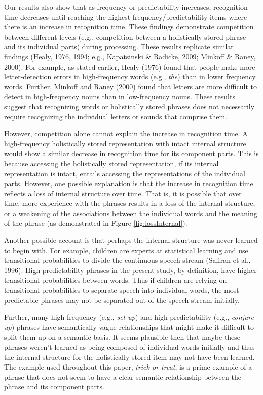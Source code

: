 \documentclass[
  man,floatsintext]{apa6}
\begin{document}
Our results also show that as frequency or predictability increases, recognition time decreases until reaching the highest frequency/predictability items where there is an increase in recognition time. These findings demonstrate competition between different levels (e.g., competition between a holistically stored phrase and its individual parts) during processing. These results replicate similar findings (Healy, 1976, 1994; e.g., Kapatsinski \& Radicke, 2009; Minkoff \& Raney, 2000). For example, as stated earlier, Healy (1976) found that people make more letter-detection errors in high-frequency words (e.g., \emph{the}) than in lower frequency words. Further, Minkoff and Raney (2000) found that letters are more difficult to detect in high-frequency nouns than in low-frequency nouns. These results suggest that recognizing words or holistically stored phrases does not necessarily require recognizing the individual letters or sounds that comprise them.

However, competition alone cannot explain the increase in recognition time. A high-frequency holistically stored representation with intact internal structure would show a similar decrease in recognition time for its component parts. This is because accessing the holistically stored representation, if its internal representation is intact, entails accessing the representations of the individual parts. However, one possible explanation is that the increase in recognition time reflects a loss of internal structure over time. That is, it is possible that over time, more experience with the phrases results in a loss of the internal structure, or a weakening of the associations between the individual words and the meaning of the phrase (as demonstrated in Figure \ref{fig:lossInternal}).

Another possible account is that perhaps the internal structure was never learned to begin with. For example, children are experts at statistical learning and use transitional probabilities to divide the continuous speech stream (Saffran et al., 1996). High predictability phrases in the present study, by definition, have higher transitional probabilities between words. Thus if children are relying on transitional probabilities to separate speech into individual words, the most predictable phrases may not be separated out of the speech stream initially.

Further, many high-frequency (e.g., \emph{set up}) and high-predictability (e.g., \emph{conjure up}) phrases have semantically vague relationships that might make it difficult to split them up on a semantic basis. It seems plausible then that maybe these phrases weren't learned as being composed of individual words initially and thus the internal structure for the holistically stored item may not have been learned. The example used throughout this paper, \emph{trick or treat}, is a prime example of a phrase that does not seem to have a clear semantic relationship between the phrase and its component parts.
\end{document}
